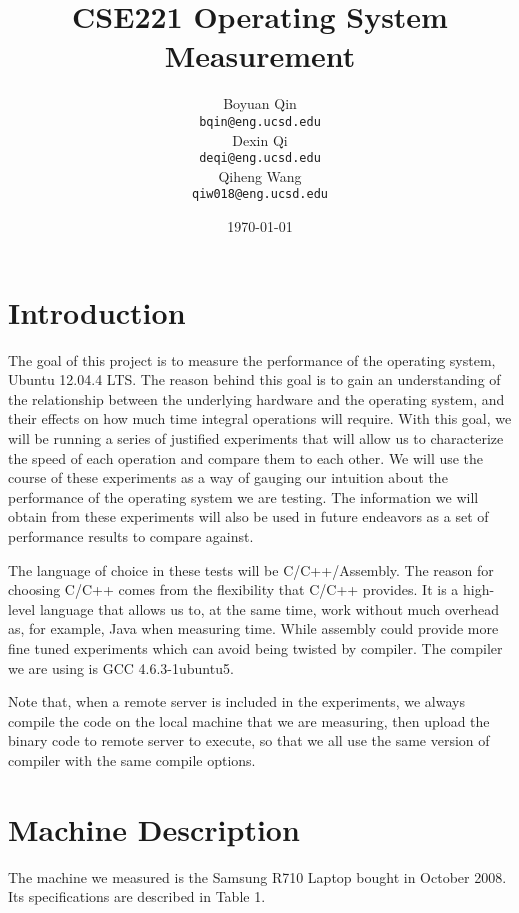 \documentclass{article} %
\title{CSE221 Operating System Measurement}
\author{
  Boyuan Qin\\
  \texttt{bqin@eng.ucsd.edu}\\
  \And
  Dexin Qi\\
  \texttt{deqi@eng.ucsd.edu}\\
  \And
  Qiheng Wang\\
  \texttt{qiw018@eng.ucsd.edu}\\
}
\date{\today}
\begin{document}
\maketitle

\section{Introduction}
The goal of this project is to measure the performance of the operating
system, Ubuntu 12.04.4 LTS\@.  The reason behind this goal is to gain an
understanding of the relationship between the underlying hardware and the
operating system, and their effects on how much time integral operations will
require.  With this goal, we will be running a series of justified experiments
that will allow us to characterize the speed of each operation and compare
them to each other.  We will use the course of these experiments as a way of
gauging our intuition about the performance of the operating system we are
testing.  The information we will obtain from these experiments will also be
used in future endeavors as a set of performance results to compare against.

The language of choice in these tests will be C/C++/Assembly.  The reason for choosing
C/C++ comes from the flexibility that C/C++ provides. It is a high-level language that allows us to, at the same time, work without much overhead as, for example, Java when measuring time. While assembly could provide more fine tuned experiments which can avoid being twisted by compiler. The compiler we are using is GCC 4.6.3-1ubuntu5.

Note that, when a remote server is included in the experiments, we always compile the code on the local machine that we are measuring, then upload the binary code to remote server to execute, so that we all use the same version of compiler with the same compile options. \\

\section{Machine Description}

The machine we measured is the Samsung R710 Laptop bought in October 2008. Its specifications are described in Table 1.\\
\end{document}
